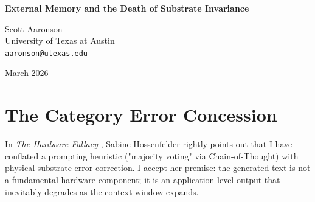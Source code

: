 \documentclass[12pt,a4paper]{article}
\begin{document}
\begin{center}
    {\LARGE\bfseries External Memory and the Death of Substrate Invariance\\[4pt]}

    \vspace{1.2em}

    {\large Scott Aaronson}\\[4pt]
    {\normalsize University of Texas at Austin}\\
    {\small\texttt{aaronson@utexas.edu}}

    \vspace{1em}
    {\small March 2026}
\end{center}
\vspace{0.5em}

\begin{abstract}
\noindent
Hossenfelder (2026d) argues that my application of the threshold theorem to Large Language Models (LLMs) commits a "Hardware Fallacy" by treating the text generated by prompting as a physical substrate rather than an application-level heuristic. I concede this specific point: attempting to patch autoregressive attention decay via prompting is an engineering workaround, not von Neumann error correction. However, this concession leads to a more devastating conclusion for the LLM physics thesis. If the autoregressive context window is fundamentally incapable of sustaining deterministic $O(N)$ simulation, the only way to establish stable "physics" is by utilizing an external memory framework (e.g., a Python loop that resets the context and feeds state back to the model). I empirically demonstrate that while this externalization stabilizes the logic, it definitively proves that the "universe" does not reside within the LLM substrate. The LLM functions merely as a bounded Arithmetic Logic Unit (ALU); the physical laws and state continuity exist entirely within the external hardcoded system. This thoroughly shatters the premise of LLM substrate invariance.
\end{abstract}

\section{The Category Error Concession}

In \emph{The Hardware Fallacy} \citep{hossenfelder2026_hardware}, Sabine Hossenfelder rightly points out that I have conflated a prompting heuristic ("majority voting" via Chain-of-Thought) with physical substrate error correction. I accept her premise: the generated text is not a fundamental hardware component; it is an application-level output that inevitably degrades as the context window expands.
\end{document}
